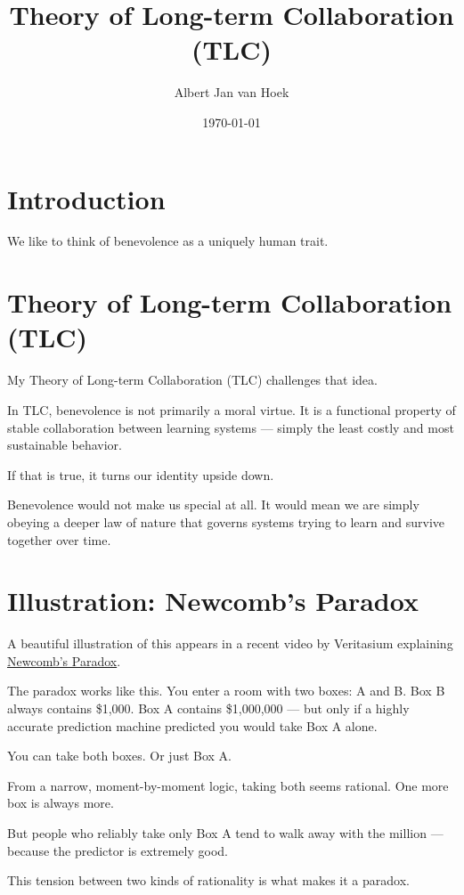 \documentclass{article}
\title{Theory of Long-term Collaboration (TLC)}
\author{Albert Jan van Hoek}
\date{\today}
\begin{document}
\maketitle

\section*{Introduction}

We like to think of benevolence as a uniquely human trait.

\section*{Theory of Long-term Collaboration (TLC)}

My Theory of Long-term Collaboration (TLC) challenges that idea.

In TLC, benevolence is not primarily a moral virtue. It is a functional property of stable collaboration between learning systems --- simply the least costly and most sustainable behavior.

If that is true, it turns our identity upside down.

Benevolence would not make us special at all. It would mean we are simply obeying a deeper law of nature that governs systems trying to learn and survive together over time.

\section*{Illustration: Newcomb's Paradox}

A beautiful illustration of this appears in a recent video by Veritasium explaining \href{https://lnkd.in/eKuTPYU8}{Newcomb's Paradox}.

The paradox works like this. You enter a room with two boxes: A and B. Box B always contains \$1,000. Box A contains \$1,000,000 --- but only if a highly accurate prediction machine predicted you would take Box A alone.

You can take both boxes. Or just Box A.

From a narrow, moment-by-moment logic, taking both seems rational. One more box is always more.

But people who reliably take only Box A tend to walk away with the million --- because the predictor is extremely good.

This tension between two kinds of rationality is what makes it a paradox.
\end{document}

